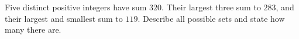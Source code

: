Five distinct positive integers have sum $320$. Their largest three sum to $283$, and their largest and smallest sum to $119$. Describe all possible sets and state how many there are.
